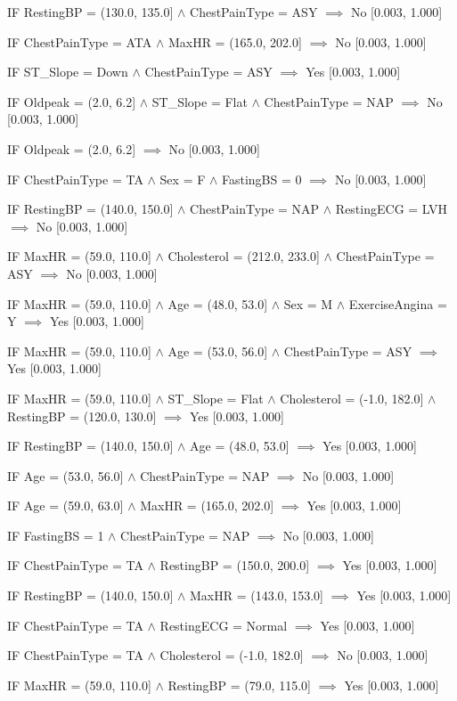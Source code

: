 IF RestingBP = (130.0, 135.0] $\land$ ChestPainType = ASY $\implies$ No [0.003, 1.000]

IF ChestPainType = ATA $\land$ MaxHR = (165.0, 202.0] $\implies$ No [0.003, 1.000]

IF ST_Slope = Down $\land$ ChestPainType = ASY $\implies$ Yes [0.003, 1.000]

IF Oldpeak = (2.0, 6.2] $\land$ ST_Slope = Flat $\land$ ChestPainType = NAP $\implies$ No [0.003, 1.000]

IF Oldpeak = (2.0, 6.2] $\implies$ No [0.003, 1.000]

IF ChestPainType = TA $\land$ Sex = F $\land$ FastingBS = 0 $\implies$ No [0.003, 1.000]

IF RestingBP = (140.0, 150.0] $\land$ ChestPainType = NAP $\land$ RestingECG = LVH $\implies$ No [0.003, 1.000]

IF MaxHR = (59.0, 110.0] $\land$ Cholesterol = (212.0, 233.0] $\land$ ChestPainType = ASY $\implies$ No [0.003, 1.000]

IF MaxHR = (59.0, 110.0] $\land$ Age = (48.0, 53.0] $\land$ Sex = M $\land$ ExerciseAngina = Y $\implies$ Yes [0.003, 1.000]

IF MaxHR = (59.0, 110.0] $\land$ Age = (53.0, 56.0] $\land$ ChestPainType = ASY $\implies$ Yes [0.003, 1.000]

IF MaxHR = (59.0, 110.0] $\land$ ST_Slope = Flat $\land$ Cholesterol = (-1.0, 182.0] $\land$ RestingBP = (120.0, 130.0] $\implies$ Yes [0.003, 1.000]

IF RestingBP = (140.0, 150.0] $\land$ Age = (48.0, 53.0] $\implies$ Yes [0.003, 1.000]

IF Age = (53.0, 56.0] $\land$ ChestPainType = NAP $\implies$ No [0.003, 1.000]

IF Age = (59.0, 63.0] $\land$ MaxHR = (165.0, 202.0] $\implies$ Yes [0.003, 1.000]

IF FastingBS = 1 $\land$ ChestPainType = NAP $\implies$ No [0.003, 1.000]

IF ChestPainType = TA $\land$ RestingBP = (150.0, 200.0] $\implies$ Yes [0.003, 1.000]

IF RestingBP = (140.0, 150.0] $\land$ MaxHR = (143.0, 153.0] $\implies$ Yes [0.003, 1.000]

IF ChestPainType = TA $\land$ RestingECG = Normal $\implies$ Yes [0.003, 1.000]

IF ChestPainType = TA $\land$ Cholesterol = (-1.0, 182.0] $\implies$ No [0.003, 1.000]

IF MaxHR = (59.0, 110.0] $\land$ RestingBP = (79.0, 115.0] $\implies$ Yes [0.003, 1.000]

